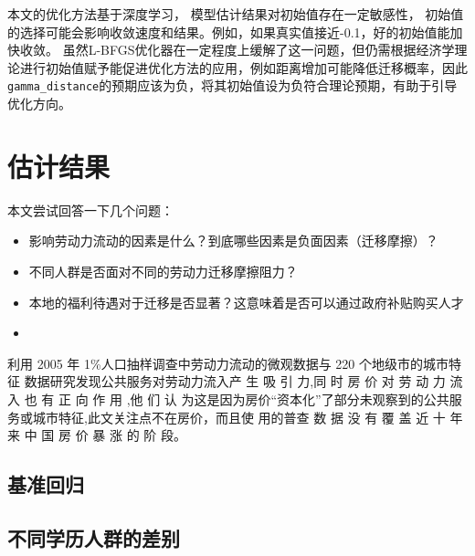 \documentclass[a4paper,12pt,oneside, fontset=mac]{ctexbook} %
\begin{document}
本文的优化方法基于深度学习，
模型估计结果对初始值存在一定敏感性，
初始值的选择可能会影响收敛速度和结果。例如，如果真实值接近-0.1，好的初始值能加快收敛。
虽然L-BFGS优化器在一定程度上缓解了这一问题，但仍需根据经济学理论进行初始值赋予能促进优化方法的应用，例如距离增加可能降低迁移概率，因此\lstinline{gamma_distance}的预期应该为负，将其初始值设为负符合理论预期，有助于引导优化方向。




\chapter{估计结果}

本文尝试回答一下几个问题：
\begin{itemize}
  \item 影响劳动力流动的因素是什么？到底哪些因素是负面因素（迁移摩擦）？
  \item 不同人群是否面对不同的劳动力迁移摩擦阻力？
  \item 本地的福利待遇对于迁移是否显著？这意味着是否可以通过政府补贴购买人才
  \item 
\end{itemize}


\cite{XiaYiRanChengShiJianDeMengMuSanQianGongGongFuWuYingXiangLaoDongLiLiuXiangDeJingYanYanJiu2015} 利用 2005 年 1\%人口抽样调查中劳动力流动的微观数据与 220 个地级市的城市特征 数据研究发现公共服务对劳动力流入产 生 吸 引 力,同 时 房 价 对 劳 动 力 流 入 也 有 正 向 作 用 ,他 们 认 为这是因为房价“资本化”了部分未观察到的公共服务或城市特征,此文关注点不在房价，而且使 用的普查 数 据 没 有 覆 盖 近 十 年 来 中 国 房 价 暴 涨 的 阶 段。

\section{基准回归} %
\label{sub:基准回归}



\section{不同学历人群的差别} %
\label{sub:不同学历人群的差别}




\end{document}
